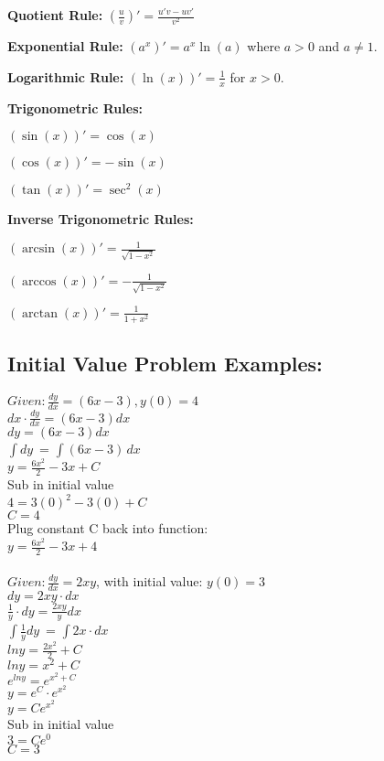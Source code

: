 \documentclass[10pt]{article}
\begin{document}
\textbf{Quotient Rule:} \( \left(\frac{u}{v}\right)' = \frac{u'v - uv'}{v^2} \)

\textbf{Exponential Rule:} \( (a^{x})' = a^{x}\ln(a) \) where \( a > 0 \) and \( a \neq 1 \).

\textbf{Logarithmic Rule:} \( (\ln(x))' = \frac{1}{x} \) for \( x > 0 \).

\textbf{Trigonometric Rules:}

\( (\sin(x))' = \cos(x) \)

\( (\cos(x))' = -\sin(x) \)

\( (\tan(x))' = \sec^2(x) \)

\textbf{Inverse Trigonometric Rules:}

\( (\arcsin(x))' = \frac{1}{\sqrt{1-x^2}} \)

\( (\arccos(x))' = -\frac{1}{\sqrt{1-x^2}} \)

\( (\arctan(x))' = \frac{1}{1+x^2} \)


\subsection{Initial Value Problem Examples:}
$ Given: \frac{dy}{dx} = (6x - 3), y(0) = 4 $\\
$ dx \cdot \frac{dy}{dx} = (6x - 3) dx $ \\
$ dy = (6x - 3) dx $ \\
\(\int dy \,\) = \(\int (6x - 3) \,dx\) \\
$ y = \frac{6x^{2}}{2} - 3x + C $ \\
Sub in initial value \\
$ 4 = 3(0)^{2} - 3(0) + C $ \\
$ C = 4 $ \\
Plug constant C back into function:\\
$ y = \frac{6x^{2}}{2} - 3x + 4 $\\\\

\noindent $ Given: \frac{dy}{dx} = 2xy $, with initial value: $ y(0) = 3 $ \\
$ dy = 2xy \cdot dx $ \\
$ \frac{1}{y} \cdot dy = \frac{2xy}{y} dx $ \\
\(\int \frac{1}{y} dy \,\) = \(\int 2x \cdot dx \,\) \\
$ lny = \frac{2x^{2}}{2} + C $ \\
$ lny = x^{2} + C $ \\
$ e^{lny} = e^{x^{2}+C} $ \\
$ y = e^{C} \cdot e^{x^{2}} $ \\
$ y = Ce^{x^{2}} $ \\
Sub in initial value \\
$ 3 = Ce^{0} $ \\
$ C = 3 $
\end{document}
